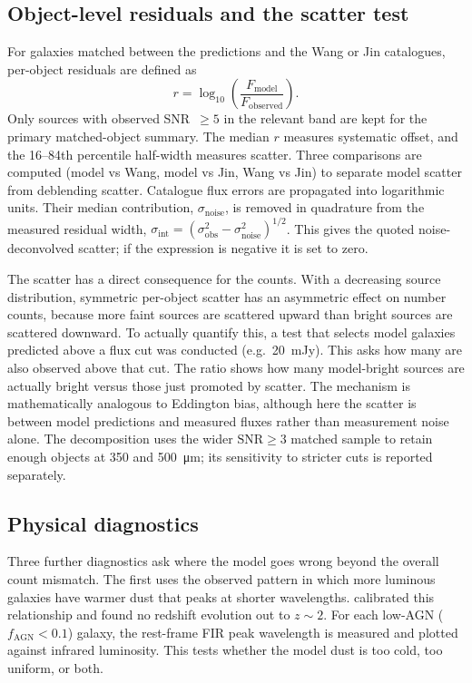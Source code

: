\documentclass[12pt,a4paper]{article}
\begin{document}
\subsection{Object-level residuals and the scatter test}
\label{sec:methods:scatter}

For galaxies matched between the \popcosmos{} predictions and the Wang or Jin
catalogues, per-object residuals are defined as
\begin{equation}
  r = \log_{10}\!\left(\frac{F_\mathrm{model}}{F_\mathrm{observed}}\right).
\end{equation}
Only sources with observed SNR~$\geq 5$ in the relevant band are kept for the primary
matched-object summary. The median
$r$ measures systematic offset, and the 16--84th percentile half-width measures
scatter. Three comparisons are computed (model vs Wang, model vs Jin, Wang vs
Jin) to separate model scatter from deblending scatter. Catalogue flux errors are
propagated into logarithmic units. Their median contribution, $\sigma_\mathrm{noise}$,
is removed in quadrature from the measured residual width,
$\sigma_\mathrm{int}=(\sigma_\mathrm{obs}^2-\sigma_\mathrm{noise}^2)^{1/2}$. This gives
the quoted noise-deconvolved scatter; if the expression is negative it is set to zero.

The scatter has a direct consequence for the counts. With a decreasing source
distribution, symmetric per-object scatter has an asymmetric effect on number
counts, because more faint sources are scattered upward than bright sources are
scattered downward. To actually quantify this, a test that selects model galaxies
predicted above a flux cut was conducted (e.g.\ \SI{20}{mJy}). This asks how many are also observed
above that cut. The ratio shows how many model-bright sources are actually bright
versus those just promoted by scatter. The mechanism is mathematically analogous to
Eddington bias, although here the scatter is between model predictions and measured
fluxes rather than measurement noise alone. The decomposition uses the wider
$\mathrm{SNR}\geq3$ matched sample to retain enough objects at 350 and
\SI{500}{\um}; its sensitivity to stricter cuts is reported separately.

\subsection{Physical diagnostics}
\label{sec:methods:diagnostics}
Three further diagnostics ask where the model goes wrong beyond the overall count
mismatch. The first uses the observed pattern in which more luminous galaxies have
warmer dust that peaks at shorter wavelengths. \citet{Drew_2022} calibrated this
relationship and found no redshift evolution out to $z\sim2$. For each low-AGN
($f_\mathrm{AGN}<0.1$) \popcosmos{} galaxy, the rest-frame FIR peak wavelength is
measured and plotted against infrared luminosity. This tests whether the model dust is
too cold, too uniform, or both.
\end{document}
